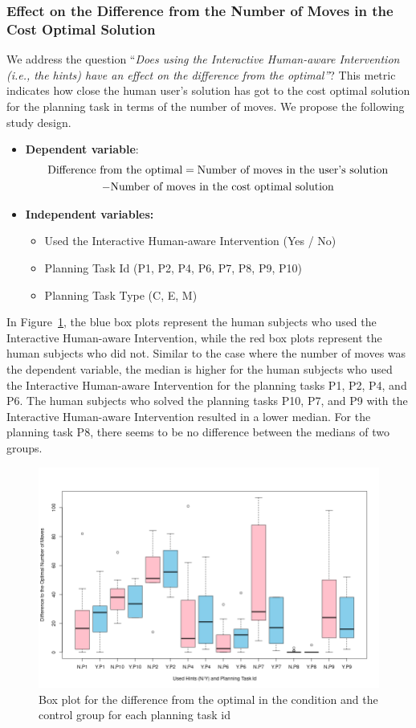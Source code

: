 \subsubsection{Effect on the Difference from the Number of Moves in the Cost Optimal Solution}
We address the question ``\textit{Does using the Interactive Human-aware Intervention (i.e., the hints) have an effect on the difference from the optimal''}?
This metric indicates how close the human user's solution has got to the cost optimal solution for the planning task in terms of the number of moves.
We propose the following study design.
\begin{itemize}
\item \textbf{Dependent variable}: 
\begin{multline}
\textup{Difference from the optimal} = \textup{Number of  moves in the user's solution}\\ - \textup{Number of moves in the cost optimal solution}
\end{multline}
\item \textbf{Independent variables:}
\begin{itemize}
\item Used the Interactive Human-aware Intervention (Yes / No)
\item Planning Task Id (P1, P2, P4, P6, P7, P8, P9, P10)
\item Planning Task Type (C, E, M)
\end{itemize}
\end{itemize}

In Figure~\ref{fig:lenoptbypid}, the blue box plots represent the human subjects who used the Interactive Human-aware Intervention, while the red box plots represent the human subjects who did not.
Similar to the case where the number of moves was the dependent variable, the median is higher for the human subjects who used the Interactive Human-aware Intervention for the planning tasks P1, P2, P4, and P6.
The human subjects who solved the planning tasks P10, P7, and P9 with the Interactive Human-aware Intervention resulted in a lower median.
For the planning task P8, there seems to be no difference between the medians of two groups.
\begin{figure}[tpb]
  \centering
\includegraphics[width=0.9\columnwidth]{img/lenoptbypid.png}
  \caption{Box plot for the difference from the optimal in the condition and the control group for each planning task id}
  \label{fig:lenoptbypid}
\end{figure}

